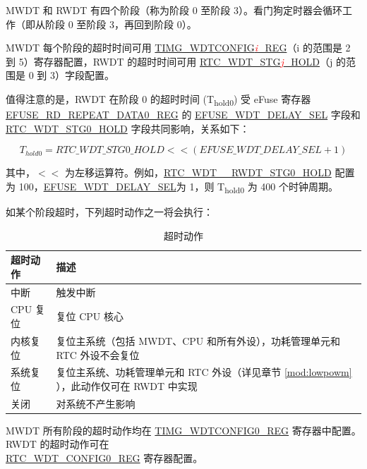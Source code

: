 \documentclass[main\_\_CN.tex]{subfiles}
\begin{document}
MWDT 和 RWDT 有四个阶段（称为阶段 0 至阶段 3）。看门狗定时器会循环工作（即从阶段 0 至阶段 3，再回到阶段 0）。

MWDT 每个阶段的超时时间可用 \hyperref[regdesc:TIMGWDTCONFIG2REG]{TIMG\_WDTCONFIG\textcolor{red}{\it{i}}\_REG}（i 的范围是 2 到 5）寄存器配置，RWDT 的超时时间可用 \hyperref[fielddesc:RTCWDTSTG3HOLD]{RTC\_WDT\_STG\textcolor{red}{\it{j}}\_HOLD}（j 的范围是 0 到 3）字段配置。

值得注意的是，RWDT 在阶段 0 的超时时间 (T\textsubscript{hold0}) 受 eFuse 寄存器 \hyperref[regdesc:EFUSERDREPEATDATA0REG]{EFUSE\_RD\_REPEAT\_DATA0\_REG} 的 \hyperref[fielddesc:EFUSEWDTDELAYSEL]{EFUSE\_WDT\_DELAY\_SEL} 字段和 \hyperref[fielddesc:RTCWDTSTG0HOLD]{RTC\_WDT\_STG0\_HOLD} 字段共同影响，关系如下：


\begin{displaymath}
T_{hold0} = \hyperref[fielddesc:RTCWDTSTG0HOLD]{RTC\_WDT\_STG0\_HOLD}   << (\hyperref[fielddesc:EFUSEWDTDELAYSEL]{EFUSE\_WDT\_DELAY\_SEL} + 1)
\end{displaymath}

其中，$<<$ 为左移运算符。例如，\hyperref[fielddesc:RTCWDTSTG0HOLD]{RTC\_WDT\_\_RWDT\_STG0\_HOLD} 配置为 100，\hyperref[fielddesc:EFUSEWDTDELAYSEL]{EFUSE\_WDT\_DELAY\_SEL}为 1，则 T\textsubscript{hold0} 为 400 个时钟周期。

如某个阶段超时，下列超时动作之一将会执行：

\begin{table}[H]
\centering
\caption{超时动作}
\label{tab:wdt-timeout-action}

\begin{tabular}{|l|m{12cm}|}
\hline
\rowcolor{lightgray}
    \textbf{超时动作} & \textbf{描述} \\\hline

    中断 &  触发中断 \\ \hline
    CPU 复位 &  复位 CPU 核心 \\ \hline
    内核复位 &  复位主系统（包括 MWDT、CPU 和所有外设），功耗管理单元和 RTC 外设不会复位\\ \hline
    系统复位 &  复位主系统、功耗管理单元和 RTC 外设（详见章节 \ref{mod:lowpowm} \textit{\nameref{mod:lowpowm}}），此动作仅可在 RWDT 中实现 \\ \hline
    关闭 &  对系统不产生影响\\ \hline

\end{tabular}
\end{table}

MWDT 所有阶段的超时动作均在 \hyperref[regdesc:TIMGWDTCONFIG0REG]{TIMG\_WDTCONFIG0\_REG} 寄存器中配置。RWDT 的超时动作可在\\ \hyperref[regdesc:RTCWDTCONFIG0REG]{RTC\_WDT\_CONFIG0\_REG} 寄存器配置。
\end{document}
